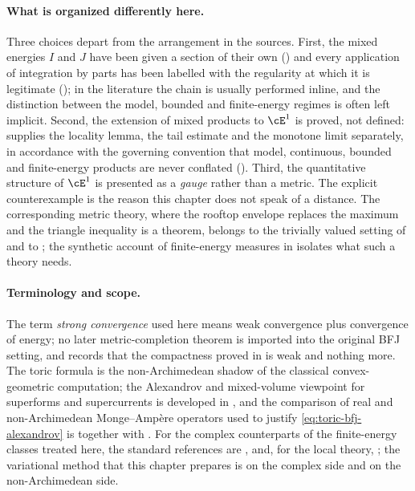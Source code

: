 \paragraph{What is organized differently here.}
Three choices depart from the arrangement in the sources.  First, the mixed
energies $I$ and $J$ have been given a section of their own
() and every application of integration by parts has
been labelled with the regularity at which it is legitimate
(); in the literature the chain is usually
performed inline, and the distinction between the model, bounded and
finite-energy regimes is often left implicit.  Second, the extension of mixed
products to $\cE^1$ is proved, not defined: 
supplies the locality lemma, the tail estimate and the monotone limit
separately, in accordance with the governing convention that model,
continuous, bounded and finite-energy products are never conflated
().  Third, the quantitative structure of
$\cE^1$ is presented as a \emph{gauge} rather than a metric.  The explicit
counterexample  is the reason this chapter does
not speak of a distance.  The corresponding metric theory, where the rooftop
envelope replaces the maximum and the triangle inequality is a theorem,
belongs to the trivially valued setting of
 and to \cite[\S12]{BJ22}; the synthetic
account of finite-energy measures in \cite{BJ25FiniteEnergy} isolates what
such a theory needs.

\paragraph{Terminology and scope.}
The term \emph{strong convergence} used here means weak convergence plus
convergence of energy; no later metric-completion theorem is imported into
the original BFJ setting, and  records
that the compactness proved in  is weak and
nothing more.  The toric formula  is the
non-Archimedean shadow of the classical convex-geometric computation; the
Alexandrov and mixed-volume viewpoint for superforms and supercurrents is
developed in \cite{Ber26Convex}, and the comparison of real and
non-Archimedean Monge--Amp\`ere operators used to justify
\eqref{eq:toric-bfj-alexandrov} is \cite{Vil20} together with
\cite{BGJKK25}.  For the complex counterparts of the finite-energy classes
treated here, the standard references are \cite{GZ07}, \cite{BEGZ10} and,
for the local theory, \cite{Ceg98,Ceg04}; the variational method that this
chapter prepares is \cite{BBGZ13} on the complex side and
\cite[\S\S7--8]{BFJ15} on the non-Archimedean side.

